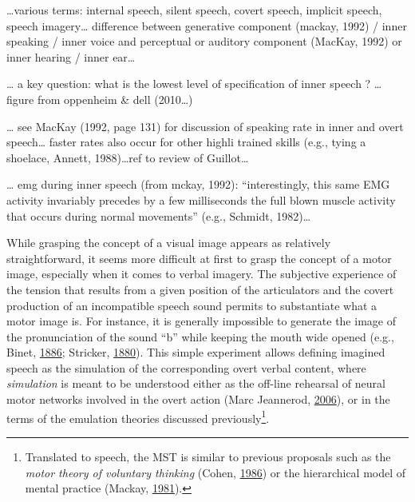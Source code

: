 \documentclass[a4paper,12pt,twoside,openright,oldfontcommands]{memoir}
\let\rmarkdownfootnote\footnote%
\def\footnote{\protect\rmarkdownfootnote}
\begin{document}
\ldots{}various terms: internal speech, silent speech, covert speech,
implicit speech, speech imagery\ldots{} difference between generative
component (mackay, 1992) / inner speaking / inner voice and perceptual
or auditory component (MacKay, 1992) or inner hearing / inner
ear\ldots{}

\ldots{} a key question: what is the lowest level of specification of
inner speech ? \ldots{} figure from oppenheim \& dell (2010\ldots{})

\ldots{} see MacKay (1992, page 131) for discussion of speaking rate in
inner and overt speech\ldots{} faster rates also occur for other highli
trained skills (e.g., tying a shoelace, Annett, 1988)\ldots{}ref to
review of Guillot\ldots{}

\ldots{} emg during inner speech (from mckay, 1992): ``interestingly,
this same EMG activity invariably precedes by a few milliseconds the
full blown muscle activity that occurs during normal movements'' (e.g.,
Schmidt, 1982)\ldots{}

While grasping the concept of a visual image appears as relatively
straightforward, it seems more difficult at first to grasp the concept
of a motor image, especially when it comes to verbal imagery. The
subjective experience of the tension that results from a given position
of the articulators and the covert production of an incompatible speech
sound permits to substantiate what a motor image is. For instance, it is
generally impossible to generate the image of the pronunciation of the
sound ``b'' while keeping the mouth wide opened (e.g., Binet,
\protect\hyperlink{ref-binet_psychologie_1886}{1886}; Stricker,
\protect\hyperlink{ref-stricker_studien_1880}{1880}). This simple
experiment allows defining imagined speech as the simulation of the
corresponding overt verbal content, where \emph{simulation} is meant to
be understood either as the off-line rehearsal of neural motor networks
involved in the overt action (Marc Jeannerod,
\protect\hyperlink{ref-jeannerod_motor_2006}{2006}), or in the terms of
the emulation theories discussed previously\footnote{Translated to
  speech, the MST is similar to previous proposals such as the
  \emph{motor theory of voluntary thinking} (Cohen,
  \protect\hyperlink{ref-cohen_motor_1986}{1986}) or the hierarchical
  model of mental practice (Mackay,
  \protect\hyperlink{ref-mackay_problem_1981}{1981}).}.
\end{document}
